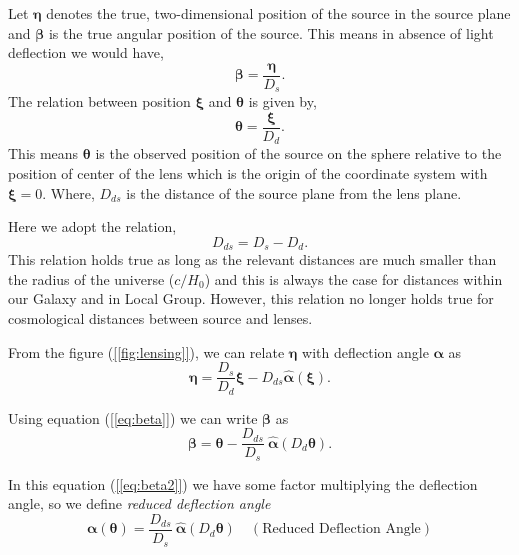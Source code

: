   Let  $\boldsymbol{\eta}$  denotes the true, two-dimensional position of the
  source in the source plane and $\boldsymbol{\beta}$ is the true angular position
  of the source. This means in absence of light deflection we would have,
  \begin{equation}\label{[eq:beta]}
    \boldsymbol{\beta} = \frac{\boldsymbol{\eta} }{D_s}.
  \end{equation}
  The relation between position $\boldsymbol{\xi}$ and $\boldsymbol{\theta}$  is
  given by,
  \begin{equation}\label{[eq:theta]}
    \boldsymbol{\theta} = \frac{\boldsymbol{\xi} }{D_d}.
  \end{equation}
  This means $\boldsymbol{\theta}$ is the observed position of the source on the
  sphere relative to the position of center of the lens which is the origin of
  the coordinate system with $\boldsymbol{\xi} = 0$. Where, $D_{ds}$ is the distance of
  the source plane from the lens plane.


  Here we adopt the relation,
  \begin{equation}\label{[eq:D_ds]}
    D_{ds} = D_s - D_d.
  \end{equation}
  This relation holds true as long as the relevant distances are much smaller
  than the radius of the universe ($c/H_0$) and this is always the case for
  distances within our Galaxy and in Local Group. However, this relation no longer
  holds true for cosmological distances between source and lenses.

  From the figure (\ref{[fig:lensing]}), we can relate $\boldsymbol{\eta}$ with
  deflection angle $\boldsymbol{\alpha}$ as
  \begin{equation}\label{[eq:eta]}
    \boldsymbol{\eta} = \frac{D_s}{D_d} \boldsymbol{\xi} - D_{ds} \hat{\boldsymbol{\alpha} } (\boldsymbol{\xi} ).
  \end{equation}

  Using equation (\ref{[eq:beta]}) we can write $\boldsymbol{\beta}$ as
  \begin{equation}\label{[eq:beta2]}
    \boldsymbol{\beta} = \boldsymbol{\theta} - \frac{D_{ds}}{D_s}\  \hat{\boldsymbol{\alpha} } (D_d \boldsymbol{\theta} ).
  \end{equation}

  In this equation (\ref{[eq:beta2]}) we have some factor multiplying the
  deflection angle, so we define \textit{reduced deflection angle}
  \begin{equation}\label{[eq:alphaReduced]}
    \boxed{\boldsymbol{\alpha} (\boldsymbol{\theta} ) = \frac{D_{ds}}{D_s}\  \hat{\boldsymbol{\alpha}} (D_d \boldsymbol{\theta} )} \quad (\text{Reduced Deflection Angle})
  \end{equation}

